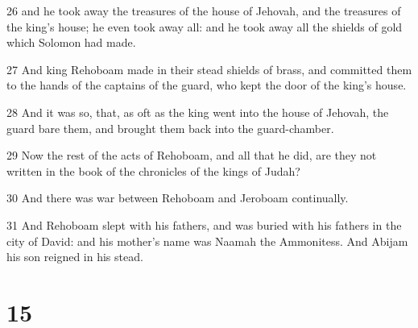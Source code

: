 \par 26 and he took away the treasures of the house of Jehovah, and the treasures of the king's house; he even took away all: and he took away all the shields of gold which Solomon had made.
\par 27 And king Rehoboam made in their stead shields of brass, and committed them to the hands of the captains of the guard, who kept the door of the king's house.
\par 28 And it was so, that, as oft as the king went into the house of Jehovah, the guard bare them, and brought them back into the guard-chamber.
\par 29 Now the rest of the acts of Rehoboam, and all that he did, are they not written in the book of the chronicles of the kings of Judah?
\par 30 And there was war between Rehoboam and Jeroboam continually.
\par 31 And Rehoboam slept with his fathers, and was buried with his fathers in the city of David: and his mother's name was Naamah the Ammonitess. And Abijam his son reigned in his stead.

\chapter{15}

